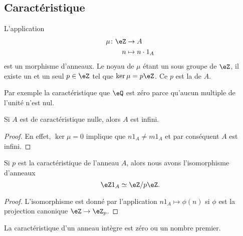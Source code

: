 \subsection{Caractéristique}

L'application 
\begin{equation}
    \begin{aligned}
        \mu\colon \eZ&\to A \\
        n&\mapsto n\cdot 1_A 
    \end{aligned}
\end{equation}
est un morphisme d'anneaux. Le noyau de \( \mu\) étant un sous groupe de \( \eZ\), il existe un et un seul \( p\in\eZ\) tel que \( \ker\mu=p\eZ\). Ce \( p\) est la  de \( A\).

Par exemple la caractéristique que \( \eQ\) est zéro parce qu'aucun multiple de l'unité n'est nul.

\begin{lemma}
    Si \( A\) est de caractéristique nulle, alors \( A\) est infini.
\end{lemma}

\begin{proof}
    En effet, \( \ker\mu=0\) implique que \( n1_A\neq  m1_A\) et par conséquent \( A\) est infini.
\end{proof}

\begin{lemma}       \label{LemHmDaYH}
    Si \( p\) est la caractéristique de l'anneau \( A\), alors nous avons l'isomorphisme d'anneaux
    \begin{equation}
         \eZ 1_A\simeq\eZ/p\eZ.
    \end{equation}
\end{lemma}

\begin{proof}
    L'isomorphisme est donné par l'application \( n1_A\mapsto \phi(n)\) si \( \phi\) est la projection canonique \( \eZ\to \eZ_p\).
\end{proof}

\begin{lemma}       \label{LemCaractIntergernbrcartpre}
    La caractéristique d'un anneau intègre est zéro ou un nombre premier.
\end{lemma}

